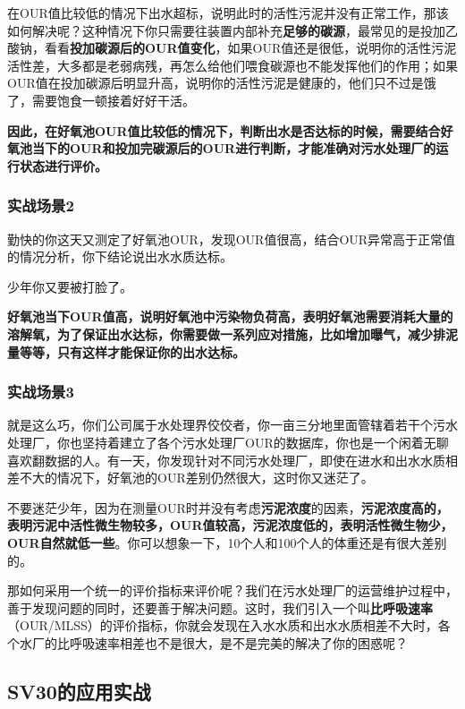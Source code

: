 \documentclass[]{book}
\begin{document}
在OUR值比较低的情况下出水超标，说明此时的活性污泥并没有正常工作，那该如何解决呢？这种情况下你只需要往装置内部补充\textbf{足够的碳源}，最常见的是投加乙酸钠，看看\textbf{投加碳源后的OUR值变化}，如果OUR值还是很低，说明你的活性污泥活性差，大多都是老弱病残，再怎么给他们喂食碳源也不能发挥他们的作用；如果OUR值在投加碳源后明显升高，说明你的活性污泥是健康的，他们只不过是饿了，需要饱食一顿接着好好干活。

\textbf{因此，在好氧池OUR值比较低的情况下，判断出水是否达标的时候，需要结合好氧池当下的OUR和投加完碳源后的OUR进行判断，才能准确对污水处理厂的运行状态进行评价。}

\hypertarget{ux5b9eux6218ux573aux666f2}{%
\subsubsection{实战场景2}\label{ux5b9eux6218ux573aux666f2}}

勤快的你这天又测定了好氧池OUR，发现OUR值很高，结合OUR异常高于正常值的情况分析，你下结论说出水水质达标。

少年你又要被打脸了。

\textbf{好氧池当下OUR值高，说明好氧池中污染物负荷高，表明好氧池需要消耗大量的溶解氧，为了保证出水达标，你需要做一系列应对措施，比如增加曝气，减少排泥量等等，只有这样才能保证你的出水达标。}

\hypertarget{ux5b9eux6218ux573aux666f3}{%
\subsubsection{实战场景3}\label{ux5b9eux6218ux573aux666f3}}

就是这么巧，你们公司属于水处理界佼佼者，你一亩三分地里面管辖着若干个污水处理厂，你也坚持着建立了各个污水处理厂OUR的数据库，你也是一个闲着无聊喜欢翻数据的人。有一天，你发现针对不同污水处理厂，即使在进水和出水水质相差不大的情况下，好氧池的OUR差别仍然很大，这时你又迷茫了。

不要迷茫少年，因为在测量OUR时并没有考虑\textbf{污泥浓度}的因素，\textbf{污泥浓度高的，表明污泥中活性微生物较多，OUR值较高，污泥浓度低的，表明活性微生物少，OUR自然就低一些}。你可以想象一下，10个人和100个人的体重还是有很大差别的。

那如何采用一个统一的评价指标来评价呢？我们在污水处理厂的运营维护过程中，善于发现问题的同时，还要善于解决问题。这时，我们引入一个叫\textbf{比呼吸速率}（OUR/MLSS）的评价指标，你就会发现在入水水质和出水水质相差不大时，各个水厂的比呼吸速率相差也不是很大，是不是完美的解决了你的困惑呢？

\hypertarget{sv30ux7684ux5e94ux7528ux5b9eux6218}{%
\subsection{SV30的应用实战}\label{sv30ux7684ux5e94ux7528ux5b9eux6218}}
\end{document}
